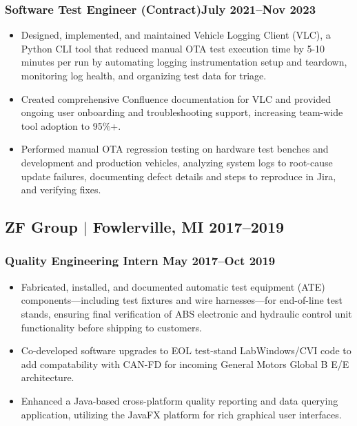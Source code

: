 \documentclass[10pt]{article}
\begin{document}
\subsubsection{Software Test Engineer (Contract)\hfill July 2021--Nov 2023}
\begin{itemize}
  \item Designed, implemented, and maintained Vehicle Logging Client (VLC),
  a Python CLI tool that reduced manual OTA test execution time by 5-10 minutes per run
  by automating logging instrumentation setup and teardown, monitoring log health, and
  organizing test data for triage.
  \item Created comprehensive Confluence documentation for VLC and provided ongoing
  user onboarding and troubleshooting support, increasing team-wide tool adoption to 95\%+.
  \item Performed manual OTA regression testing on hardware test benches and development and
  production vehicles, analyzing system logs to root-cause update failures,
  documenting defect details and steps to reproduce in Jira, and verifying fixes.
\end{itemize}

\subsection{ZF Group $|$ {\normalfont Fowlerville, MI} \hfill 2017--2019}
\vspace*{0.05in}
\subsubsection{Quality Engineering Intern \hfill May 2017--Oct 2019}
\begin{itemize}
  \item Fabricated, installed, and documented automatic test equipment (ATE) components—including
  test fixtures and wire harnesses—for end-of-line test stands, ensuring final verification of ABS
  electronic and hydraulic control unit functionality before shipping to customers.
  \item Co-developed software upgrades to EOL test-stand LabWindows/CVI code to add compatability with CAN-FD for
  incoming General Motors Global B E/E architecture.
  \item Enhanced a Java-based cross-platform quality reporting and data querying application, utilizing the JavaFX
  platform for rich graphical user interfaces.
\end{itemize}
\end{document}
